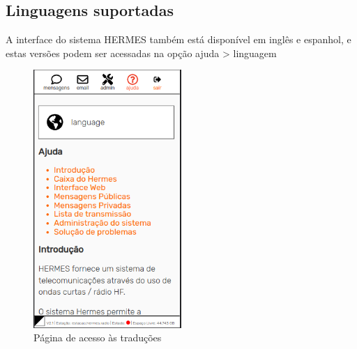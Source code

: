 \documentclass[11pt,a4paper]{article}
\begin{document}



\subsection{Linguagens suportadas}
\label{langs}

A interface do sistema HERMES também está disponível em inglês e espanhol, e estas versões podem ser acessadas na opção ajuda > linguagem


\begin{figure}[H]
    \centering
    \includegraphics[width=0.5\textwidth]{screenshots/frontend/pt_kn/languages.png}
    \caption{Página de acesso às traduções}
	\vspace{-10pt}
    \label{fig:languages}
\end{figure}
\end{document}
